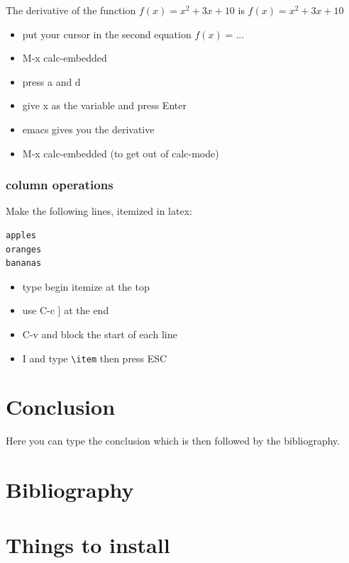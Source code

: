 \documentclass[11pt]{article}
\begin{document}
The derivative of the function $f(x) = x^2 + 3x +10$ is $f(x) = x^2 + 3 x + 10$

\begin{itemize}
\item put your cursor in the second equation $f(x)=...$
\item M-x calc-embedded
\item press a and d
\item give x as the variable and press Enter
\item emacs gives you the derivative
\item M-x calc-embedded (to get out of calc-mode)
\end{itemize}

\subsubsection{column operations}

Make the following lines, itemized in latex:

\begin{verbatim}
apples
oranges
bananas
\end{verbatim}

\begin{itemize}
\item type begin itemize at the top
\item use C-c ] at the end
\item C-v and block the start of each line
\item I and type \texttt{\textbackslash{}item} then press ESC
\end{itemize}


\section{Conclusion}

Here you can type the conclusion which is then followed by the bibliography.

\section{Bibliography}








\newpage
\appendix


\section{Things to install}
\label{sec:install}
\end{document}
